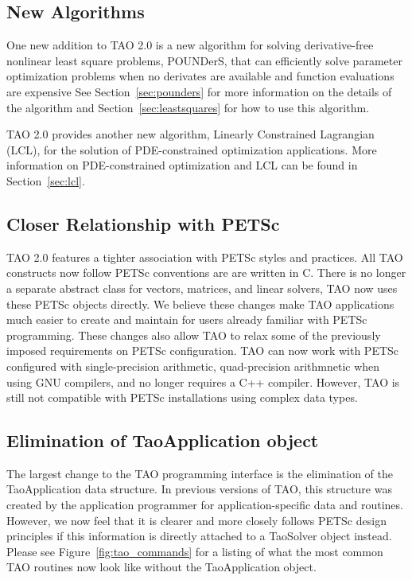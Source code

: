 \subsection{New Algorithms}
One new addition to TAO 2.0 is a new algorithm for solving derivative-free
 nonlinear
least square problems, POUNDerS,
that can efficiently solve parameter optimization problems when no
derivates are available and function evaluations are expensive 
See Section~\ref{sec:pounders} for more information on the details of the
algorithm and Section~\ref{sec:leastsquares} for how to use this algorithm.

TAO 2.0 provides another new algorithm, Linearly Constrained Lagrangian (LCL),
for the solution of PDE-constrained optimization applications.  More information
on PDE-constrained optimization and LCL can be found in Section~\ref{sec:lcl}.

\subsection{Closer Relationship with PETSc}
TAO 2.0 features a tighter association with PETSc styles and practices.
All TAO constructs now follow PETSc conventions are are written in C.
There is no longer a separate abstract class for vectors, matrices, and linear
solvers, TAO now uses these PETSc objects directly. We believe these changes
make TAO applications much easier to create and maintain for users already 
familiar with PETSc programming. These changes also allow TAO to relax some
of the previously imposed requirements on PETSc configuration. TAO can now
work with PETSc configured with single-precision arithmetic, quad-precision 
arithmnetic when using GNU compilers, and no longer requires a C++ compiler.
However, TAO is still not compatible with PETSc installations using complex
data types.

\subsection{Elimination of TaoApplication object}
The largest change to the TAO programming interface is the elimination of the
TaoApplication data structure. In previous versions of TAO, this
structure was created by the application programmer for application-specific
data and routines. However, we now feel that it is clearer and more
closely follows PETSc design principles if this information is directly
attached to a TaoSolver object instead. Please see 
Figure~\ref{fig:tao_commands} for a listing of what the most common TAO 
routines now look like without the TaoApplication object.

